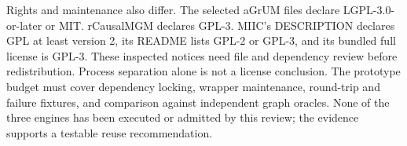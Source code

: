 Rights and maintenance also differ. The selected aGrUM files declare
LGPL-3.0-or-later or MIT. rCausalMGM declares GPL-3. MIIC's DESCRIPTION declares
GPL at least version 2, its README lists GPL-2 or GPL-3, and its bundled full
license is GPL-3. These inspected notices need file and dependency review
before redistribution. Process separation alone is not a license conclusion.
The prototype budget must cover dependency locking, wrapper maintenance,
round-trip and failure fixtures, and comparison against independent graph
oracles. None of the three engines has been executed or admitted by this
review; the evidence supports a testable reuse recommendation.
\label{exec14:cxx-latent-end}

